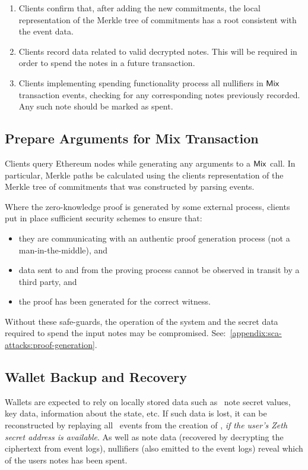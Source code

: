 \begin{enumerate}
    \item Clients \MUST{} confirm that, after adding the new commitments, the local representation of the Merkle tree of commitments has a root consistent with the event data.
    \item Clients \SHOULD{} record data related to valid decrypted notes. This will be required in order to spend the notes in a future transaction.
    \item Clients implementing spending functionality \SHOULD{} process all nullifiers in $\mathsf{Mix}$ transaction events, checking for any corresponding notes previously recorded. Any such note should be marked as spent.
\end{enumerate}

\subsection{Prepare Arguments for Mix Transaction}

Clients \MUSTNOT{} query Ethereum nodes while generating any arguments to a $\mathsf{Mix}$ call. In particular, Merkle paths \MUST{} be calculated using the clients representation of the Merkle tree of commitments that was constructed by parsing events.

Where the zero-knowledge proof is generated by some external process, clients \MUST{} put in place sufficient security schemes to ensure that:
\begin{itemize}
    \item they are communicating with an authentic proof generation process (not a man-in-the-middle), and
    \item data sent to and from the proving process cannot be observed in transit by a third party, and
    \item the proof has been generated for the correct witness.
\end{itemize}

Without these safe-guards, the operation of the system and the secret data required to spend the input notes may be compromised.  See:~\cref{appendix:sca-attacks:proof-generation}.

\subsection{Wallet Backup and Recovery}\label{client-security:wallet-backup-and-recovery}

Wallets are expected to rely on locally stored data such as \zeth~note secret values, key data, information about the \mixer state, etc.  If such data is lost, it can be reconstructed by replaying all \mixer~events from the creation of \mixer, \emph{if the user's Zeth secret address is available}. As well as note data (recovered by decrypting the ciphertext from event logs), nullifiers (also emitted to the event logs) reveal which of the users notes has been spent.


